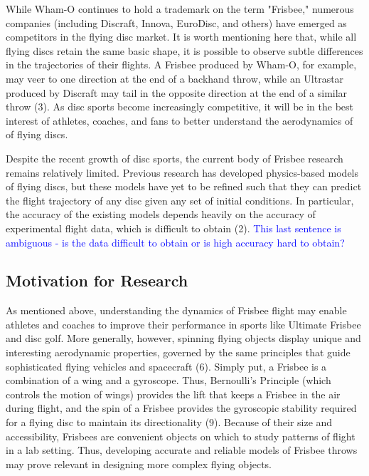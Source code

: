 \documentclass[a4paper,12pt, oneside]{article}
\newcommand{\blue}[1]{\textcolor{blue}{#1}}
\begin{document}
While Wham-O continues to hold a trademark on the term "Frisbee," numerous companies (including Discraft, Innova, EuroDisc, and others) have emerged as competitors in the flying disc market. It is worth mentioning here that, while all flying discs retain the same basic shape, it is possible to observe subtle differences in the trajectories of their flights.  A Frisbee produced by Wham-O, for example, may veer to one direction at the end of a backhand throw, while an Ultrastar produced by Discraft may tail in the opposite direction at the end of a similar throw (3).  As disc sports become increasingly competitive, it will be in the best interest of athletes, coaches, and fans to better understand the aerodynamics of of flying discs.

Despite the recent growth of disc sports, the current body of Frisbee research remains relatively limited. Previous research has developed physics-based models of flying discs, but these models have yet to be refined such that they can predict the flight trajectory of any disc given any set of initial conditions. In particular, the accuracy of the existing models depends heavily on the accuracy of experimental flight data, which is difficult to obtain (2). \blue{This last sentence is ambiguous - is the data difficult to obtain or is high accuracy hard to obtain?}

\subsection{Motivation for Research}

As mentioned above, understanding the dynamics of Frisbee flight may enable athletes and coaches to improve their performance in sports like Ultimate Frisbee and disc golf.  More generally, however, spinning flying objects display unique and interesting aerodynamic properties, governed by the same principles that guide sophisticated flying vehicles and spacecraft (6). Simply put, a Frisbee is a combination of a wing and a gyroscope. Thus, Bernoulli's Principle (which controls the motion of wings) provides the lift that keeps a Frisbee in the air during flight, and the spin of a Frisbee provides the gyroscopic stability required for a flying disc to maintain its directionality (9). Because of their size and accessibility, Frisbees are convenient objects on which to study patterns of flight in a lab setting. Thus, developing accurate and reliable models of Frisbee throws may prove relevant in designing more complex flying objects. 
 
\end{document}
